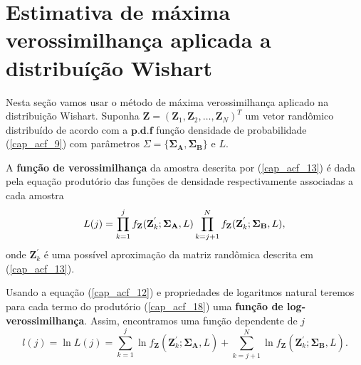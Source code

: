 \section{Estimativa de máxima verossimilhança aplicada a distribuíção Wishart}

Nesta seção vamos usar o método de máxima verossimilhança aplicado na distribuição Wishart. Suponha $\mathbf{Z}=(\mathbf{Z}_1,\mathbf{Z}_2,\dots,\mathbf{Z}_N)^T$ um vetor randômico distribuído de acordo com a $\mathbf{p.d.f}$ função densidade de probabilidade (\ref{cap_acf_9}) com parâmetros $\Sigma=\{\mathbf{\Sigma_A}, \mathbf{\Sigma_B\}}$ e $L$.

A \textbf{função de verossimilhança} da amostra descrita por (\ref{cap_acf_13}) é dada pela equação produtório das funções de densidade respectivamente associadas a cada amostra
\begin{equation}\label{cap_acf_18}
	L(j)=\prod_{k=1}^{j}f_{\mathbf{Z}}(\mathbf{Z}_{k}^{'};\mathbf{\Sigma_{A}},L) \prod_{k=j+1}^{N}f_{\mathbf{Z}}(\mathbf{Z}_{k}^{'};\mathbf{\Sigma_{B}},L), \\
\end{equation}
onde $\mathbf{Z}_{k}^{'}$ é uma possível aproximação da matriz randômica descrita em (\ref{cap_acf_13}).

Usando a equação (\ref{cap_acf_12}) e propriedades de logaritmos natural teremos para cada termo do produtório (\ref{cap_acf_18}) uma \textbf{função de log-verossimilhança}. Assim, encontramos uma função dependente de $j$
\begin{equation}\label{cap_acf_19}
	l(j)=\ln L(j)=\sum_{k=1}^{j}\ln f_{\mathbf{Z}}(\mathbf{Z}_{k}^{'};\mathbf{\Sigma_{A}},L)+ \sum_{k=j+1}^{N}\ln f_{\mathbf{Z}}(\mathbf{Z}_{k}^{'};\mathbf{\Sigma_{B}},L).
\end{equation}

